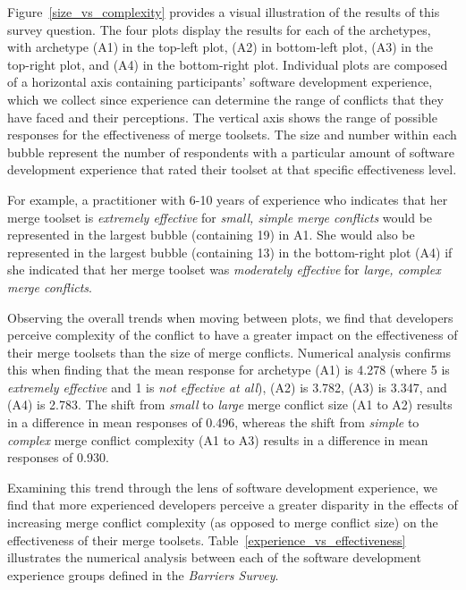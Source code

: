 Figure~\ref{size_vs_complexity} provides a visual illustration of the results of this survey question.
The four plots display the results for each of the archetypes, with archetype (A1) in the top-left plot, (A2) in bottom-left plot, (A3) in the top-right plot, and (A4) in the bottom-right plot.
Individual plots are composed of a horizontal axis containing participants' software development experience, which we collect since experience can determine the range of conflicts that they have faced and their perceptions.
The vertical axis shows the range of possible responses for the effectiveness of merge toolsets.
The size and number within each bubble represent the number of respondents with a particular amount of software development experience that rated their toolset at that specific effectiveness level.

For example, a practitioner with 6-10 years of experience who indicates that her merge toolset is \textit{extremely effective} for \textit{small, simple merge conflicts} would be represented in the largest bubble (containing 19) in A1. %
She would also be represented in the largest bubble (containing 13) in the bottom-right plot (A4) if she indicated that her merge toolset was \textit{moderately effective} for \textit{large, complex merge conflicts}.

Observing the overall trends when moving between plots, we find that developers perceive complexity of the conflict to have a greater impact on the effectiveness of their merge toolsets than the size of merge conflicts.
Numerical analysis confirms this when finding that the mean response for archetype (A1) is 4.278 (where 5 is \textit{extremely effective} and 1 is \textit{not effective at all}), (A2) is 3.782, (A3) is 3.347, and (A4) is 2.783.
The shift from \textit{small} to \textit{large} merge conflict size (A1 to A2) results in a difference in mean responses of 0.496, whereas the shift from \textit{simple} to \textit{complex} merge conflict complexity (A1 to A3) results in a difference in mean responses of 0.930.

Examining this trend through the lens of software development experience, we find that more experienced developers perceive a greater disparity in the effects of increasing merge conflict complexity (as opposed to merge conflict size) on the effectiveness of their merge toolsets.
Table~\ref{experience_vs_effectiveness} illustrates the numerical analysis between each of the software development experience groups defined in the \textit{Barriers Survey}.

